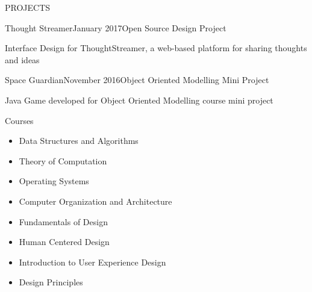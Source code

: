 \documentclass{resume} %
\begin{document}
\begin{rSection}{PROJECTS}


\begin{rSubsection}{Thought Streamer}{January 2017}{Open Source Design Project}{}

\item Interface Design for ThoughtStreamer, a web-based platform for sharing thoughts and ideas 
\end{rSubsection}


\begin{rSubsection}{Space Guardian}{November 2016}{Object Oriented Modelling Mini Project}{}    

\item Java Game developed for Object Oriented Modelling course mini project

\end{rSubsection} 
\item
\end{rSection} 


\begin{rSection}{Courses}\itemsep -3pt 

\begin{multicols}{2}
    \begin{itemize}
        \item Data Structures and Algorithms
        \item Theory of Computation
        \item Operating Systems
        \item Computer Organization and Architecture
        \item Fundamentals of Design
        \item Human Centered Design
        \item Introduction to User Experience Design
        \item Design Principles
    \end{itemize}
    \end{multicols}

\end{rSection}  
 
  
\end{document}

